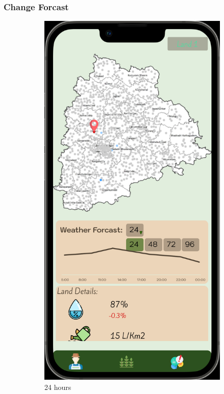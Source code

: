 \subsubsection{Change Forcast}
\begin{figure}[ht] 
  \begin{subfigure}[b]{0.6\linewidth}
    \centering
    \includegraphics[width=0.6\linewidth]{figures/forcastchange1.png}
    \caption{24 hours} 
    \label{fig:a} 
    \vspace{4ex}
  \end{subfigure}%
  \begin{subfigure}[b]{0.6\linewidth}
    \centering

\end{subfigure}
\end{figure}
